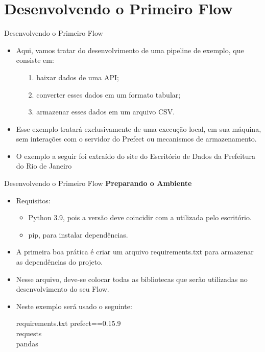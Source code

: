 \documentclass[t,serif]{beamer}
\begin{document}
\section{Desenvolvendo o Primeiro Flow}
	\begin{frame}{Desenvolvendo o Primeiro Flow}
		\begin{itemize}
			\item Aqui, vamos tratar do desenvolvimento de uma pipeline de exemplo, que consiste em:
			\begin{enumerate}
				\item[1.] baixar dados de uma API;
				\item[2.] converter esses dados em um formato tabular;
				\item[3.] armazenar esses dados em um arquivo CSV.
			\end{enumerate}
			\vspace{0.5cm}
			\item Esse exemplo tratará exclusivamente de uma execução local, em sua máquina, sem interações com o servidor do Prefect ou mecanismos de armazenamento.
			\vspace{0.5cm}
			\item O exemplo a seguir foi extraído do site do Escritório de Dados da Prefeitura do Rio de Janeiro 
		\end{itemize}
	\end{frame}
	
	\begin{frame}{Desenvolvendo o Primeiro Flow}
		\textbf{Preparando o Ambiente}
		\begin{itemize}
			\item Requisitos:
			\begin{itemize}
				\item Python 3.9, pois a versão deve coincidir com a utilizada pelo escritório.
				\item pip, para instalar dependências.
			\end{itemize}
			\item A primeira boa prática é criar um arquivo requirements.txt para armazenar as dependências do projeto.
			\item Nesse arquivo, deve-se colocar todas as bibliotecas que serão utilizadas no desenvolvimento do seu Flow.
			\item Neste exemplo será usado o seguinte:
			\begin{block}{requirements.txt}
				prefect==0.15.9\\
				requests\\
				pandas
			\end{block}
		\end{itemize}
	\end{frame}
	
\end{document}
